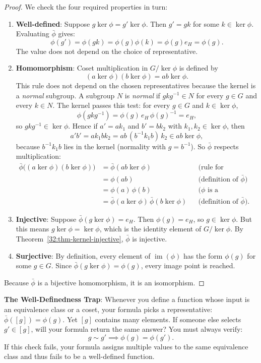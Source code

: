 \begin{proof}
We check the four required properties in turn:
\begin{enumerate}
  \item \textbf{Well-defined}: Suppose $g\ker\phi = g'\ker\phi$. Then $g' = gk$ for some $k \in \ker\phi$. Evaluating $\bar{\phi}$ gives:
  \[
  \phi(g') = \phi(gk) = \phi(g)\phi(k) = \phi(g)e_H = \phi(g).
  \]
  The value does not depend on the choice of representative.
  \item \textbf{Homomorphism}: Coset multiplication in $G/\ker\phi$ is defined by
  \[
  (a\ker\phi)(b\ker\phi) = ab\ker\phi.
  \]
  This rule does not depend on the chosen representatives because the kernel is a \emph{normal} subgroup. A subgroup $N$ is \emph{normal} if $gkg^{-1} \in N$ for every $g \in G$ and every $k \in N$. The kernel passes this test: for every $g \in G$ and $k \in \ker\phi$,
  \[
  \phi(gkg^{-1}) = \phi(g)\,e_H\,\phi(g)^{-1} = e_H,
  \]
  so $gkg^{-1} \in \ker\phi$. Hence if $a' = ak_1$ and $b' = bk_2$ with $k_1, k_2 \in \ker\phi$, then
  \[
  a'b' = ak_1bk_2 = ab\,(b^{-1}k_1b)\,k_2 \in ab\ker\phi,
  \]
  because $b^{-1}k_1b$ lies in the kernel (normality with $g = b^{-1}$). So $\bar{\phi}$ respects multiplication:
  \begin{align*}
  \bar{\phi}\bigl((a\ker\phi)(b\ker\phi)\bigr) &= \bar{\phi}(ab\ker\phi) && \text{(rule for multiplying cosets)} \\
  &= \phi(ab) && \text{(definition of $\bar{\phi}$)} \\
  &= \phi(a)\,\phi(b) && \text{($\phi$ is a homomorphism)} \\
  &= \bar{\phi}(a\ker\phi)\,\bar{\phi}(b\ker\phi) && \text{(definition of $\bar{\phi}$).}
  \end{align*}
  \item \textbf{Injective}: Suppose $\bar{\phi}(g\ker\phi) = e_H$. Then $\phi(g) = e_H$, so $g \in \ker\phi$. But this means $g\ker\phi = \ker\phi$, which is the identity element of $G/\ker\phi$. By Theorem~\ref{32:thm-kernel-injective}, $\bar{\phi}$ is injective.
  \item \textbf{Surjective}: By definition, every element of $\operatorname{im}(\phi)$ has the form $\phi(g)$ for some $g \in G$. Since $\bar{\phi}(g\ker\phi) = \phi(g)$, every image point is reached.
\end{enumerate}
Because $\bar{\phi}$ is a bijective homomorphism, it is an isomorphism.
\end{proof}

\begin{trapbox}
\textbf{The Well-Definedness Trap}: Whenever you define a function whose input is an equivalence class or a coset, your formula picks a representative: $\bar{\phi}([g]) = \phi(g)$. Yet $[g]$ contains many elements. If someone else selects $g' \in [g]$, will your formula return the same answer? You must always verify:
\[
g \sim g' \implies \phi(g) = \phi(g').
\]
If this check fails, your formula assigns multiple values to the same equivalence class and thus fails to be a well-defined function.
\end{trapbox}

